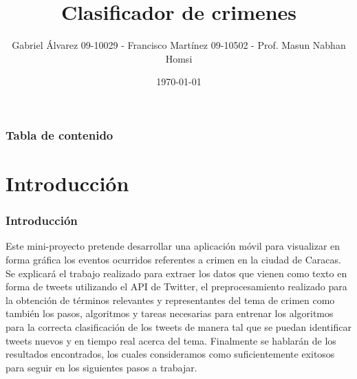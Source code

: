 \documentclass{beamer}
\title[Proyecto Final]{Clasificador de crimenes} %
\author{Gabriel \'{A}lvarez 09-10029 - Francisco Mart\'{i}nez 09-10502 - Prof. Masun Nabhan Homsi} %
\institute[USB] %
{
Universidad Sim\'{o}n Bol\'{i}var \\ %
\medskip
\textit{gabrielaar11@gmail.com - frammnm@gmail.com - mnabhan@usb.ve} %
}
\date{\today} %
\newcommand\Fontvi{\fontsize{10}{7.2}\selectfont}
\begin{document}
    

\begin{frame}
\titlepage %
\end{frame}

\begin{frame}[allowframebreaks=0.95]
\frametitle{Tabla de contenido} %
\tableofcontents %
\end{frame}


\section{Introducci\'{o}n} %
\begin{frame}
\frametitle{Introducci\'{o}n}
\Fontvi
Este mini-proyecto pretende desarrollar una aplicaci\'{o}n m\'{o}vil para visualizar en forma gr\'{a}fica los eventos ocurridos referentes a crimen en la ciudad de Caracas. Se explicar\'{a} el trabajo realizado para extraer los datos que vienen como texto en forma de tweets utilizando el API de Twitter, el preprocesamiento realizado para la obtenci\'{o}n de t\'{e}rminos relevantes y representantes del tema de crimen como tambi\'{e}n los pasos, algoritmos y tareas necesarias para entrenar los algoritmos para la correcta clasificaci\'{o}n de los tweets de manera tal que se puedan identificar tweets nuevos y en tiempo real acerca del tema. Finalmente se hablar\'{a}n de los resultados encontrados, los cuales consideramos como suficientemente exitosos para seguir en los siguientes pasos a trabajar.
\end{frame}
\end{document}
